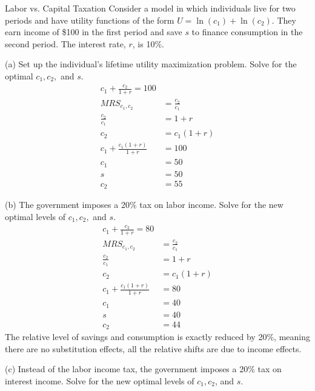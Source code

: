 \documentclass[10pt]{extarticle}
\title{}
\author{}
\date{}
\begin{document}
  \begin{problem}{Labor vs. Capital Taxation}
    Consider a model in which individuals live for two periods and have utility functions of the form $U = \ln(c_1) + \ln(c_2)$. They earn income of \$100 in the first period and save $s$ to finance consumption in the second period. The interest rate, $r$, is 10\%.
    \tcblower
    \begin{problem}{(a)}
      Set up the individual's lifetime utility maximization problem. Solve for the optimal $c_1,c_2,$ and $s$.
      \tcblower
      \begin{align*}
        c_1 + \frac{c_2}{1+r} = 100\\
        MRS_{c_1,c_2} &= \frac{c_2}{c_1}\\
        \frac{c_2}{c_1} &= 1+r\\
        c_2 &= c_1 (1+r)\\
        c_1 + \frac{c_1(1+r)}{1+r} &= 100\\
        c_1 &= 50\\
        s &= 50\\
        c_2 &= 55
      \end{align*}
    \end{problem}
    \begin{problem}{(b)}
      The government imposes a 20\% tax on labor income. Solve for the new optimal levels of $c_1,c_2,$ and $s$. 
      \tcblower
      \begin{align*}
        c_1 + \frac{c_2}{1+r} = 80\\
        MRS_{c_1,c_2} &= \frac{c_2}{c_1}\\
        \frac{c_2}{c_1} &= 1+r\\
        c_2 &= c_1 (1+r)\\
        c_1 + \frac{c_1(1+r)}{1+r} &= 80\\
        c_1 &= 40\\
        s &= 40\\
        c_2 &= 44
      \end{align*}
      The relative level of savings and consumption is exactly reduced by 20\%, meaning there are no substitution effects, all the relative shifts are due to income effects.
    \end{problem}
    \begin{problem}{(c)}
      Instead of the labor income tax, the government imposes a 20\% tax on interest income. Solve for the new optimal levels of $c_1,c_2$, and $s$.
      \tcblower
      \begin{align*}

\end{align*}
\end{problem}
\end{problem}
\end{document}
